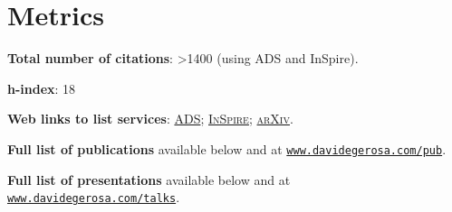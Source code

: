 \documentclass[a4paper]{moderncv}
\begin{document}
\section{Metrics}

\textcolor{mark_color}{\textbf{Total number of citations}}:  {>1400}  (using ADS and InSpire).

\textcolor{mark_color}{\textbf{h-index}}: 18

\textcolor{mark_color}{\textbf{Web links to list services}}:
\href{https://ui.adsabs.harvard.edu/search/fq=%7B!type%3Daqp%20v%3D%24fq_doctype%7D&fq_doctype=(doctype%3A%22misc%22%20OR%20doctype%3A%22inproceedings%22%20OR%20doctype%3A%22article%22%20OR%20doctype%3A%22eprint%22)&q=%20author%3A%22Gerosa%2C%20Davide%22&sort=citation_count%20desc%2C%20bibcode%20desc&p_=0}{\textsc{ADS}};
\href{http://inspirehep.net/search?ln=en&ln=en&p=exactauthor%3AD.Gerosa.1&of=hb&action_search=Search&sf=&so=d&rm=citation&rg=25&sc=0}{\textsc{InSpire}};
\href{http://arxiv.org/a/gerosa_d_1.html}{\textsc{arXiv}}.

\textbf{Full list of publications} available below and at \href{http://www.davidegerosa.com/pub}{\texttt{www.davidegerosa.com/pub}}.
\vspace{0.2cm}


\textbf{Full list of presentations} available below and at \href{http://www.davidegerosa.com/talks}{\texttt{www.davidegerosa.com/talks}}.
\end{document}
